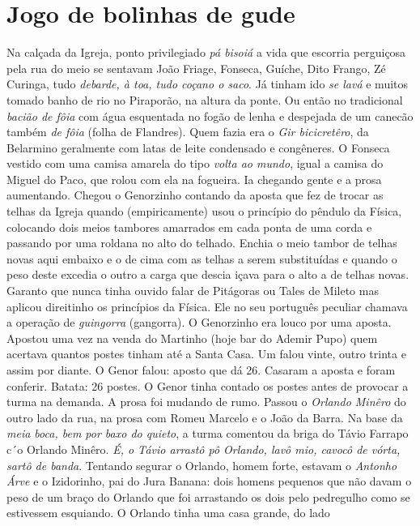 \documentclass[12pt,brazil,]{book}
\begin{document}
\section{Jogo de bolinhas de gude}\label{jogo-de-bolinhas-de-gude}

Na calçada da Igreja, ponto privilegiado \emph{pá bisoiá} a vida que
escorria perguiçosa pela rua do meio se sentavam João Friage, Fonseca,
Guíche, Dito Frango, Zé Curinga, tudo \emph{debarde, à toa, tudo coçano
o saco}. Já tinham ido \emph{se lavá} e muitos tomado banho de rio no
Piraporão, na altura da ponte. Ou então no tradicional \emph{bacião de
fôia} com água esquentada no fogão de lenha e despejada de um canecão
também \emph{de fôia} (folha de Flandres). Quem fazia era o \emph{Gir
bicicretêro}, da Belarmino geralmente com latas de leite condensado e
congêneres. O Fonseca vestido com uma camisa amarela do tipo \emph{volta
ao mundo}, igual a camisa do Miguel do Paco, que rolou com ela na
fogueira. Ia chegando gente e a prosa aumentando. Chegou o Genorzinho
contando da aposta que fez de trocar as telhas da Igreja quando
(empiricamente) usou o princípio do pêndulo da Física, colocando dois
meios tambores amarrados em cada ponta de uma corda e passando por uma
roldana no alto do telhado. Enchia o meio tambor de telhas novas aqui
embaixo e o de cima com as telhas a serem substituídas e quando o peso
deste excedia o outro a carga que descia içava para o alto a de telhas
novas. Garanto que nunca tinha ouvido falar de Pitágoras ou Tales de
Mileto mas aplicou direitinho os princípios da Física. Ele no seu
português peculiar chamava a operação de \emph{guingorra} (gangorra). O
Genorzinho era louco por uma aposta. Apostou uma vez na venda do
Martinho (hoje bar do Ademir Pupo) quem acertava quantos postes tinham
até a Santa Casa. Um falou vinte, outro trinta e assim por diante. O
Genor falou: aposto que dá 26. Casaram a aposta e foram conferir.
Batata: 26 postes. O Genor tinha contado os postes antes de provocar a
turma na demanda. A prosa foi mudando de rumo. Passou o \emph{Orlando
Minêro} do outro lado da rua, na prosa com Romeu Marcelo e o João da
Barra. Na base da \emph{meia boca, bem por baxo do quieto}, a turma
comentou da briga do Távio Farrapo c´o Orlando Minêro. \emph{É, o Távio
arrastô pô Orlando, lavô mio, cavocô de vórta, sartô de banda}. Tentando
segurar o Orlando, homem forte, estavam o \emph{Antonho Árve} e o
Izidorinho, pai do Jura Banana: dois homens pequenos que não davam o
peso de um braço do Orlando que foi arrastando os dois pelo pedregulho
como se estivessem esquiando. O Orlando tinha uma casa grande, do lado
\end{document}
